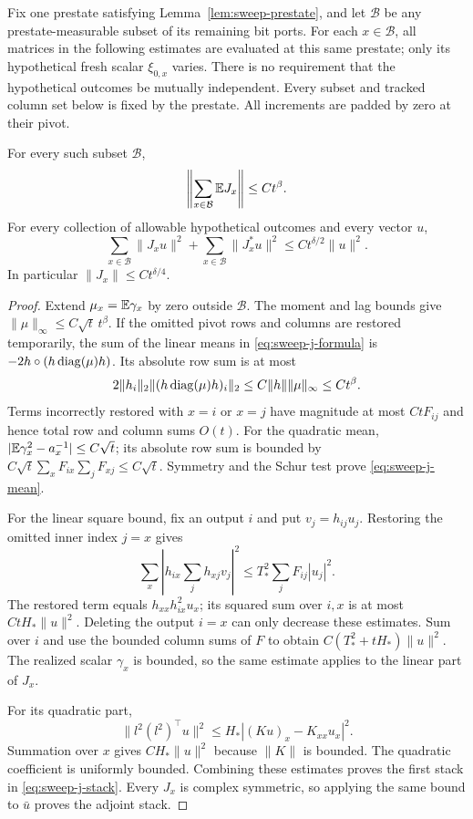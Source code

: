 Fix one prestate satisfying Lemma~\ref{lem:sweep-prestate}, and let
$\mathcal B$ be any prestate-measurable subset of its remaining bit ports. For each
$x\in\mathcal B$, all matrices in the following estimates are evaluated
at this same prestate; only its hypothetical fresh scalar $\xi_{0,x}$ varies.
There is no requirement that the hypothetical outcomes be mutually
independent. Every subset and tracked column set below is fixed by the
prestate. All increments are padded by zero at their pivot.

\begin{lemma}\label{lem:sweep-j}
For every such subset $\mathcal B$,
\begin{equation}\label{eq:sweep-j-mean}
 \left\|\sum_{x\in\mathcal B}\mathbb E J_x\right\|\le Ct^\beta.
\end{equation}
For every collection of allowable hypothetical outcomes and every vector
$u$,
\begin{equation}\label{eq:sweep-j-stack}
 \sum_{x\in\mathcal B}\|J_xu\|^2
 +\sum_{x\in\mathcal B}\|J_x^*u\|^2
 \le Ct^{\delta/2}\|u\|^2.
\end{equation}
In particular $\|J_x\|\le Ct^{\delta/4}$.
\end{lemma}

\begin{proof}
Extend $\mu_x=\mathbb E\gamma_x$ by zero outside $\mathcal B$.
The moment and lag bounds give
$\|\mu\|_\infty\le C\sqrt t\,t^\beta$.
If the omitted pivot rows and columns are restored temporarily, the sum
of the linear means in \eqref{eq:sweep-j-formula} is
$-2h\circ(h\operatorname{diag}(\mu)h)$. Its absolute row sum is at most
\[
 2\|h_i\|_2\|(h\operatorname{diag}(\mu)h)_i\|_2
 \le C\|h\|\|\mu\|_\infty\le Ct^\beta.
\]
Terms incorrectly restored with $x=i$ or $x=j$ have magnitude at most
$CtF_{ij}$ and hence total row and column sums $O(t)$.
For the quadratic mean,
$|\mathbb E\gamma_x^2-a_x^{-1}|\le C\sqrt t$; its absolute row sum is
bounded by
$C\sqrt t\sum_xF_{ix}\sum_jF_{xj}\le C\sqrt t$.
Symmetry and the Schur test prove \eqref{eq:sweep-j-mean}.

For the linear square bound, fix an output $i$ and put $v_j=h_{ij}u_j$.
Restoring the omitted inner index $j=x$ gives
\[
 \sum_x\left|h_{ix}\sum_jh_{xj}v_j\right|^2
 \le T_*^2\sum_jF_{ij}|u_j|^2.
\]
The restored term equals $h_{xx}h_{ix}^2u_x$; its squared sum over
$i,x$ is at most $CtH_*\|u\|^2$.
Deleting the output $i=x$ can only decrease these estimates.
Sum over $i$ and use the bounded column sums of $F$ to obtain
$C(T_*^2+tH_*)\|u\|^2$. The realized scalar $\gamma_x$ is bounded,
so the same estimate applies to the linear part of $J_x$.

For its quadratic part,
\[
 \|l^2(l^2)^\top u\|^2
 \le H_*|(Ku)_x-K_{xx}u_x|^2.
\]
Summation over $x$ gives $CH_*\|u\|^2$ because $\|K\|$ is bounded.
The quadratic coefficient is uniformly bounded. Combining these
estimates proves the first stack in \eqref{eq:sweep-j-stack}.
Every $J_x$ is complex symmetric, so applying the same bound to
$\bar u$ proves the adjoint stack.
\end{proof}

